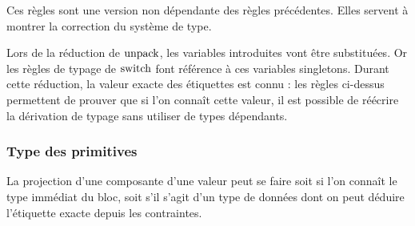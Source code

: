 \begin{mathpar}
%




%
\end{mathpar}
%
Ces règles sont une version non dépendante des règles précédentes. Elles
servent à montrer la correction du système de type.

Lors de la réduction de $\kw{unpack}$, les variables introduites vont être
substituées. Or les règles de typage de $\kw{switch}$ font référence à ces
variables singletons. Durant cette réduction, la valeur exacte des étiquettes
est connu : les règles ci-dessus permettent de prouver que si l'on connaît
cette valeur, il est possible de réécrire la dérivation de typage sans utiliser
de types dépendants.

\subsubsection{Type des primitives}

\begin{mathpar}

\end{mathpar}
%
La projection d'une composante d'une valeur peut se faire soit si l'on connaît
le type immédiat du bloc, soit s'il s'agit d'un type de données dont on peut
déduire l'étiquette exacte depuis les contraintes.

